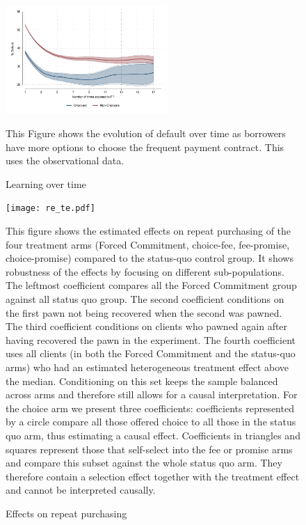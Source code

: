\documentclass[oneside,11pt]{article}
\begin{document}
\begin{figure}[H]
        \caption{Learning over time}
    \label{fc_discount_rates}
    \begin{center}
        \centering
        \includegraphics[width=0.55\textwidth]{Figuras/learning_over_time.pdf}
    \end{center}
     \scriptsize This Figure shows the evolution of default over time as borrowers have more options to choose the frequent payment contract. This uses the observational data. 
\end{figure}


\vspace{.3in}
\begin{figure}[H]
        \caption{Effects on repeat purchasing}
    \label{reincidence}
    \begin{center}
        \centering
        \texttt{[image: re\_te.pdf]}
    \end{center}
     \scriptsize This figure shows the estimated effects on repeat purchasing of the four treatment arms (Forced Commitment, choice-fee, fee-promise, choice-promise) compared to the status-quo control group. It shows robustness of the effects by focusing on different sub-populations. The leftmost coefficient compares all the Forced Commitment group against all status quo group. The second coefficient conditions on the first pawn not being recovered when the second was pawned. The third coefficient conditions on clients who pawned again after having recovered the pawn in the experiment. The fourth coefficient uses all clients (in both the Forced Commitment and the status-quo arms) who had an estimated heterogeneous treatment effect above the median. Conditioning on this set keeps the sample balanced across arms and therefore still allows for a causal interpretation. For the choice arm we present three coefficients: coefficients represented by a circle compare all those offered choice to all those in the status quo arm, thus estimating a causal effect. Coefficients in triangles and squares represent those that self-select into the fee or promise arms and compare this subset against the whole status quo arm. They therefore contain a selection effect together with the treatment effect and cannot be interpreted causally.
\end{figure}
\end{document}
